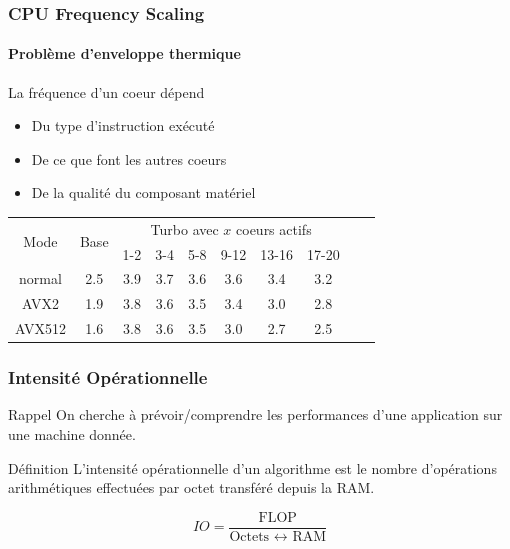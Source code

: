 \documentclass[xcolor={x11names,svgnames}, 14pt]{beamer}
\begin{document}
\begin{frame}
  \frametitle{CPU Frequency Scaling}
  \framesubtitle{Problème d'enveloppe thermique}
  
  \begin{block}{La fréquence d'un coeur dépend}
  \begin{itemize}
  \item Du type d'instruction exécuté
  \item De ce que font les autres coeurs
  \item De la qualité du composant matériel
  \end{itemize}
\end{block}

\bigskip

\centering
  \small
\begin{tabular}{|c|c||c|c|c|c|c|c|c|c|}
  \hline
  \multirow{2}{*}{Mode}   & \multirow{2}{*}{Base} & \multicolumn{6}{c|}{Turbo avec $x$ coeurs actifs} \\
  & &             1-2 & 3-4 & 5-8 & 9-12 & 13-16 & 17-20 \\
  \hline\hline
  normal & 2.5	& 3.9 & 3.7 & 3.6 & 3.6 & 3.4 & 3.2 \\
  \hline
  AVX2	 & 1.9	& 3.8 & 3.6 & 3.5 & 3.4 & 3.0 & 2.8 \\
  \hline
  AVX512 & 1.6	& 3.8 & 3.6 & 3.5 & 3.0 & 2.7 & 2.5 \\
  \hline
\end{tabular}
\end{frame}


\begin{frame}
  \frametitle{Intensité Opérationnelle}

  \begin{block}{Rappel}
    On cherche à prévoir/comprendre les performances d'une application sur une machine donnée.
  \end{block}

  \begin{exampleblock}{Définition}
    L'\alert{intensité opérationnelle} d'un algorithme est le nombre
    d'opérations arithmétiques effectuées par octet transféré depuis la RAM.
  \end{exampleblock}
  
  \[
    IO = \dfrac{\text{FLOP}}{\text{Octets }\leftrightarrow\text{ RAM}}
  \]
\end{frame}

\end{document}
